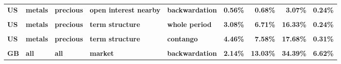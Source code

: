 \documentclass[
  authoryear,
  preprint,
  3p]{elsarticle}
\begin{document}
\begin{landscape}
\begin{longtable}[t]{>{}l>{}l>{}l>{}l>{}l>{}r>{}r>{}r>{}r}
\textbf{US} & \textbf{metals} & \textbf{precious} & \textbf{open interest nearby} & \textbf{backwardation} & \textcolor[HTML]{4285f4}{\textbf{0.56\%}} & \textcolor[HTML]{4285f4}{\textbf{0.68\%}} & \textcolor[HTML]{4285f4}{\textbf{3.07\%}} & \textcolor[HTML]{4285f4}{\textbf{0.24\%}}\\
\addlinespace
\textbf{\cellcolor{gray!10}{US}} & \textbf{\cellcolor{gray!10}{metals}} & \textbf{\cellcolor{gray!10}{precious}} & \textbf{\cellcolor{gray!10}{open interest nearby}} & \textbf{\cellcolor{gray!10}{contango}} & \textcolor[HTML]{4285f4}{\textbf{\cellcolor{gray!10}{0.71\%}}} & \textcolor[HTML]{4285f4}{\textbf{\cellcolor{gray!10}{1.15\%}}} & \textcolor[HTML]{4285f4}{\textbf{\cellcolor{gray!10}{4.53\%}}} & \textcolor[HTML]{4285f4}{\textbf{\cellcolor{gray!10}{0.21\%}}}\\
\textbf{US} & \textbf{metals} & \textbf{precious} & \textbf{term structure} & \textbf{whole period} & \textcolor[HTML]{4285f4}{\textbf{3.08\%}} & \textcolor[HTML]{4285f4}{\textbf{6.71\%}} & \textcolor[HTML]{4285f4}{\textbf{16.33\%}} & \textcolor[HTML]{4285f4}{\textbf{0.24\%}}\\
\textbf{\cellcolor{gray!10}{US}} & \textbf{\cellcolor{gray!10}{metals}} & \textbf{\cellcolor{gray!10}{precious}} & \textbf{\cellcolor{gray!10}{term structure}} & \textbf{\cellcolor{gray!10}{backwardation}} & \textcolor[HTML]{4285f4}{\textbf{\cellcolor{gray!10}{1.79\%}}} & \textcolor[HTML]{4285f4}{\textbf{\cellcolor{gray!10}{6.21\%}}} & \textcolor[HTML]{4285f4}{\textbf{\cellcolor{gray!10}{14.69\%}}} & \textcolor[HTML]{4285f4}{\textbf{\cellcolor{gray!10}{0.39\%}}}\\
\textbf{US} & \textbf{metals} & \textbf{precious} & \textbf{term structure} & \textbf{contango} & \textcolor[HTML]{4285f4}{\textbf{4.46\%}} & \textcolor[HTML]{4285f4}{\textbf{7.58\%}} & \textcolor[HTML]{4285f4}{\textbf{17.68\%}} & \textcolor[HTML]{4285f4}{\textbf{0.31\%}}\\
\textbf{\cellcolor{gray!10}{GB}} & \textbf{\cellcolor{gray!10}{all}} & \textbf{\cellcolor{gray!10}{all}} & \textbf{\cellcolor{gray!10}{market}} & \textbf{\cellcolor{gray!10}{whole period}} & \textcolor[HTML]{4285f4}{\textbf{\cellcolor{gray!10}{1.74\%}}} & \textcolor[HTML]{4285f4}{\textbf{\cellcolor{gray!10}{11.71\%}}} & \textcolor[HTML]{4285f4}{\textbf{\cellcolor{gray!10}{33.71\%}}} & \textcolor[HTML]{4285f4}{\textbf{\cellcolor{gray!10}{10.75\%}}}\\
\addlinespace
\textbf{GB} & \textbf{all} & \textbf{all} & \textbf{market} & \textbf{backwardation} & \textcolor[HTML]{4285f4}{\textbf{2.14\%}} & \textcolor[HTML]{4285f4}{\textbf{13.03\%}} & \textcolor[HTML]{4285f4}{\textbf{34.39\%}} & \textcolor[HTML]{4285f4}{\textbf{6.62\%}}\\

\end{longtable}
\end{landscape}
\end{document}
